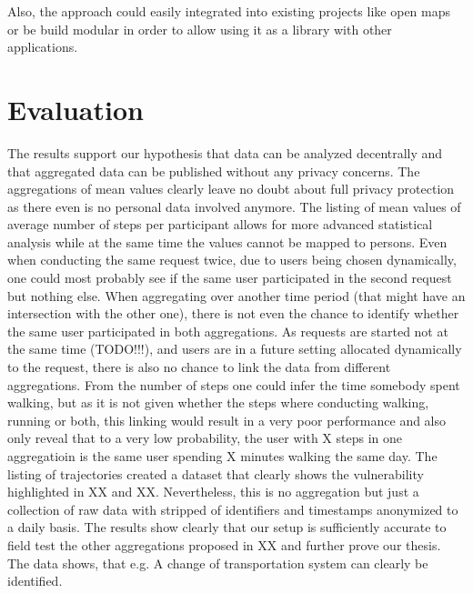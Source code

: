 Also, the approach could easily integrated into existing projects like open maps or be build modular in order to allow using it as a library with other applications.

\section{Evaluation}
The results support our hypothesis that data can be analyzed decentrally and that aggregated data can be published without any privacy concerns. The aggregations of mean values clearly leave no doubt about full privacy protection as there even is no personal data involved anymore. The listing of mean values of average number of steps per participant allows for more advanced statistical analysis while at the same time the values cannot be mapped to persons. Even when conducting the same request twice, due to users being chosen dynamically, one could most probably see if the same user participated in the second request but nothing else. When aggregating over another time period (that might have an intersection with the other one), there is not even the chance to identify whether the same user participated in both aggregations. As requests are started not at the same time (TODO!!!), and users are in a future setting allocated dynamically to the request, there is also no chance to link the data from different aggregations. From the number of steps one could infer the time somebody spent walking, but as it is not given whether the steps where conducting walking, running or both, this linking would result in a very poor performance and also only reveal that to a very low probability, the user with X steps in one aggregatioin is the same user spending X minutes walking the same day. 
The listing of trajectories created a dataset that clearly shows the vulnerability highlighted in XX and XX. Nevertheless, this is no aggregation but just a collection of raw data with stripped of identifiers and timestamps anonymized to a daily basis. The results show clearly that our setup is sufficiently accurate to field test the other aggregations proposed in XX and further prove our thesis. The data shows, that e.g. A change of transportation system can clearly be identified. 
